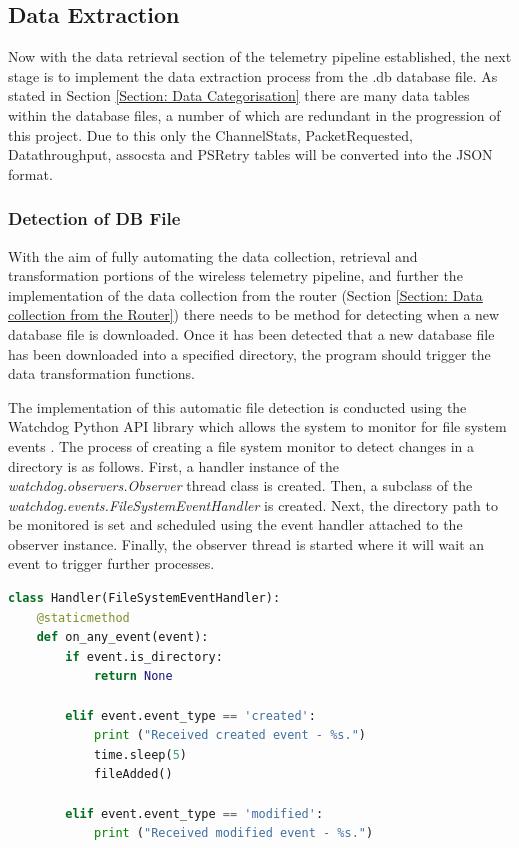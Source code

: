 \subsection{Data Extraction} \label{section:Data Extraction}

Now with the data retrieval section of the telemetry pipeline established, the next stage is to implement the data extraction process from the .db database file. As stated in Section \ref{Section: Data Categorisation} there are many data tables within the database files, a number of which are redundant in the progression of this project. Due to this only the ChannelStats, PacketRequested, Datathroughput, assocsta and PSRetry tables will be converted into the JSON format. 

\subsubsection{Detection of DB File}

With the aim of fully automating the data collection, retrieval and transformation portions of the wireless telemetry pipeline, and further the implementation of the data collection from the router (Section \ref{Section: Data collection from the Router}) there needs to be method for detecting when a new database file is downloaded. Once it has been detected that a new database file has been downloaded into a specified directory, the program should trigger the data transformation functions. 

The implementation of this automatic file detection is conducted using the Watchdog Python API library which allows the system to monitor for file system events \cite{watchdog}. The process of creating a file system monitor to detect changes in a directory is as follows. First, a handler instance of the \textit{watchdog.observers.Observer} thread class is created. Then, a subclass of the \textit{watchdog.events.FileSystemEventHandler} is created. Next, the directory path to be monitored is set and scheduled using the event handler attached to the observer instance. Finally, the observer thread is started where it will wait an event to trigger further processes. 

\begin{lstlisting}[language=Python, caption={Watchdog File System Event Handler Code Snippet}, label={lst:watchodog}]
class Handler(FileSystemEventHandler):
    @staticmethod
    def on_any_event(event):
        if event.is_directory:
            return None

        elif event.event_type == 'created':
            print ("Received created event - %s.")
            time.sleep(5)
            fileAdded()

        elif event.event_type == 'modified':
            print ("Received modified event - %s.")
\end{lstlisting}

